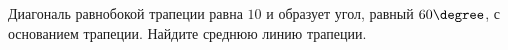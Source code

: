 \begin{ex}
	\begin{condition}
		Диагональ равнобокой трапеции равна \( 10  \) и образует угол, равный \( 60\degree\), с основанием трапеции. Найдите среднюю линию трапеции.
	\end{condition}
\end{ex}